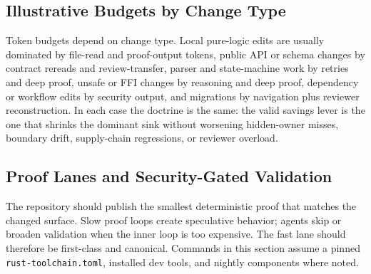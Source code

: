 \documentclass[conference]{IEEEtran}
\begin{document}
\subsection{Illustrative Budgets by Change Type}
Token budgets depend on change type. Local pure-logic edits are usually dominated by file-read and proof-output tokens, public API or schema changes by contract rereads and review-transfer, parser and state-machine work by retries and deep proof, unsafe or FFI changes by reasoning and deep proof, dependency or workflow edits by security output, and migrations by navigation plus reviewer reconstruction. In each case the doctrine is the same: the valid savings lever is the one that shrinks the dominant sink without worsening hidden-owner misses, boundary drift, supply-chain regressions, or reviewer overload.

\subsection{Proof Lanes and Security-Gated Validation}
\label{sec:proof}
The repository should publish the smallest deterministic proof that matches the changed surface. Slow proof loops create speculative behavior; agents skip or broaden validation when the inner loop is too expensive. The fast lane should therefore be first-class and canonical. Commands in this section assume a pinned \texttt{rust-toolchain.toml}, installed dev tools, and nightly components where noted.
\end{document}
